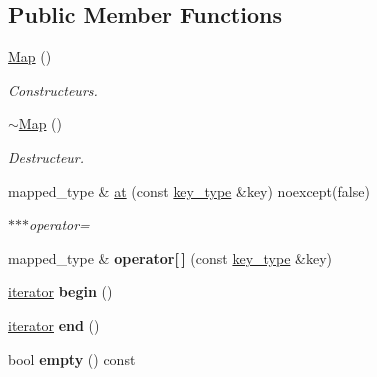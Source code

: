 \subsection*{Public Member Functions}
\begin{DoxyCompactItemize}
\item 
\mbox{\label{classMap_a49c4ffcfa9ba5bd31de35b53c221f7e5}} 
\hyperlink{classMap_a49c4ffcfa9ba5bd31de35b53c221f7e5}{Map} ()
\begin{DoxyCompactList}\small\item\em Constructeurs. \end{DoxyCompactList}\item 
\mbox{\label{classMap_a46dd58359ab2daf8a9a1716887fa4117}} 
\hyperlink{classMap_a46dd58359ab2daf8a9a1716887fa4117}{$\sim$\+Map} ()
\begin{DoxyCompactList}\small\item\em Destructeur. \end{DoxyCompactList}\item 
\mbox{\label{classMap_a1c02b23ab8409b9a58e435bde918ee0c}} 
mapped\+\_\+type \& \hyperlink{classMap_a1c02b23ab8409b9a58e435bde918ee0c}{at} (const \hyperlink{classMap_a430e42d1c6a02e95eb3a34626e313441}{key\+\_\+type} \&key) noexcept(false)
\begin{DoxyCompactList}\small\item\em $\ast$$\ast$$\ast$operator= \end{DoxyCompactList}\item 
\mbox{\label{classMap_a307e9f53295d762c9779164bb1c63ff5}} 
mapped\+\_\+type \& {\bfseries operator\mbox{[}$\,$\mbox{]}} (const \hyperlink{classMap_a430e42d1c6a02e95eb3a34626e313441}{key\+\_\+type} \&key)
\item 
\mbox{\label{classMap_acddad9ed9807a59b7ecc293232432345}} 
\hyperlink{classMapIterator}{iterator} {\bfseries begin} ()
\item 
\mbox{\label{classMap_a7757badfe22cfd0353b9be3ca0657bb9}} 
\hyperlink{classMapIterator}{iterator} {\bfseries end} ()
\item 
\mbox{\label{classMap_adc19ca31d3af23f59500f19896f98e0d}} 
bool {\bfseries empty} () const

\end{DoxyCompactItemize}
